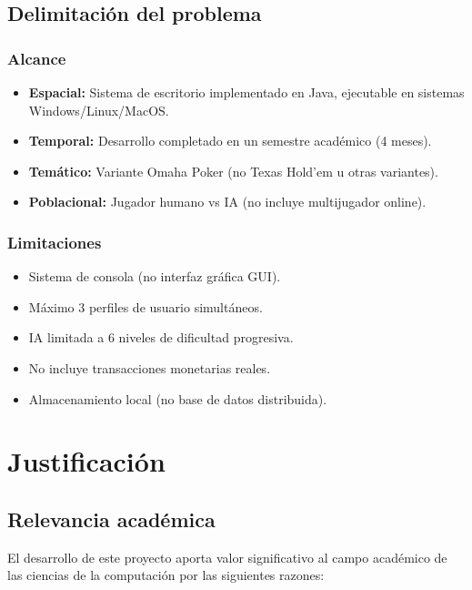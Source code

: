 \documentclass[12pt,a4paper]{article}
\begin{document}
\subsection{Delimitación del problema}

\subsubsection{Alcance}
\begin{itemize}
    \item \textbf{Espacial:} Sistema de escritorio implementado en Java, ejecutable en sistemas Windows/Linux/MacOS.
    \item \textbf{Temporal:} Desarrollo completado en un semestre académico (4 meses).
    \item \textbf{Temático:} Variante Omaha Poker (no Texas Hold'em u otras variantes).
    \item \textbf{Poblacional:} Jugador humano vs IA (no incluye multijugador online).
\end{itemize}

\subsubsection{Limitaciones}
\begin{itemize}
    \item Sistema de consola (no interfaz gráfica GUI).
    \item Máximo 3 perfiles de usuario simultáneos.
    \item IA limitada a 6 niveles de dificultad progresiva.
    \item No incluye transacciones monetarias reales.
    \item Almacenamiento local (no base de datos distribuida).
\end{itemize}

\newpage

\section{Justificación}

\subsection{Relevancia académica}

El desarrollo de este proyecto aporta valor significativo al campo académico de las ciencias de la computación por las siguientes razones:
\end{document}
